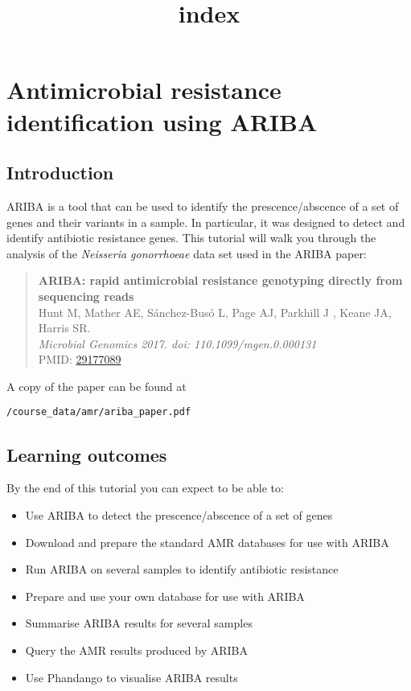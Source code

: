 \documentclass[11pt]{article}
\title{index}
\providecommand{\tightlist}{%
      \setlength{\itemsep}{0pt}\setlength{\parskip}{0pt}}
\begin{document}
    \hypertarget{antimicrobial-resistance-identification-using-ariba}{%
\section{Antimicrobial resistance identification using
ARIBA}\label{antimicrobial-resistance-identification-using-ariba}}

\hypertarget{introduction}{%
\subsection{Introduction}\label{introduction}}

ARIBA is a tool that can be used to identify the prescence/abscence of a
set of genes and their variants in a sample. In particular, it was
designed to detect and identify antibiotic resistance genes. This
tutorial will walk you through the analysis of the \textit{Neisseria
gonorrhoeae} data set used in the ARIBA paper:

\begin{quote}
\textbf{ARIBA: rapid antimicrobial resistance genotyping directly from
sequencing reads}\\
Hunt M, Mather AE, Sánchez-Busó L, Page AJ, Parkhill J , Keane JA,
Harris SR.\\
\textit{Microbial Genomics 2017. doi: 110.1099/mgen.0.000131}\\
PMID:
\href{https://www.ncbi.nlm.nih.gov/pmc/articles/PMC5695208/}{29177089}
\end{quote}

A copy of the paper can be found at

\texttt{/course\_data/amr/ariba\_paper.pdf}

\hypertarget{learning-outcomes}{%
\subsection{Learning outcomes}\label{learning-outcomes}}

By the end of this tutorial you can expect to be able to:

\begin{itemize}
\tightlist
\item
  Use ARIBA to detect the prescence/abscence of a set of genes
\item
  Download and prepare the standard AMR databases for use with ARIBA
\item
  Run ARIBA on several samples to identify antibiotic resistance
\item
  Prepare and use your own database for use with ARIBA
\item
  Summarise ARIBA results for several samples
\item
  Query the AMR results produced by ARIBA
\item
  Use Phandango to visualise ARIBA results
\end{itemize}
\end{document}
